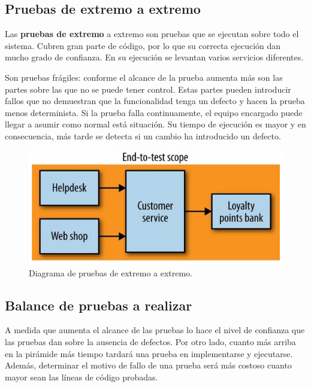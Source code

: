 \documentclass[11pt,spanish,listoffigures]{tfgetsinf}
\begin{document}
\subsection{Pruebas de extremo a extremo}

Las \textbf{pruebas de extremo} a extremo son pruebas que se ejecutan sobre todo el sistema. Cubren gran parte de código, por lo que su correcta ejecución dan mucho grado de confianza. En su ejecución se levantan varios servicios diferentes.

Son pruebas frágiles: conforme el alcance de la prueba aumenta más son las partes sobre las que no se puede tener control. Estas partes pueden introducir fallos que no demuestran que la funcionalidad tenga un defecto y hacen la prueba menos determinista. Si la prueba falla continuamente, el equipo encargado puede llegar a asumir como normal está situación. Su tiempo de ejecución es mayor y en consecuencia, más tarde se detecta si un cambio ha introducido un defecto. \cite{Newman2015a}

\begin{figure}[h]
\centering
\includegraphics[scale=0.5]{End_To_End_Test}
\caption{Diagrama de pruebas de extremo a extremo.}
\end{figure}

\subsection{Balance de pruebas a realizar}

A medida que aumenta el alcance de las pruebas lo hace el nivel de confianza que las pruebas dan sobre la ausencia de defectos. Por otro lado, cuanto más arriba en la pirámide más tiempo tardará una prueba en implementarse y ejecutarse. Además, determinar el motivo de fallo de una prueba será más costoso cuanto mayor sean las líneas de código probadas. \cite{Cohn2010}
\end{document}
